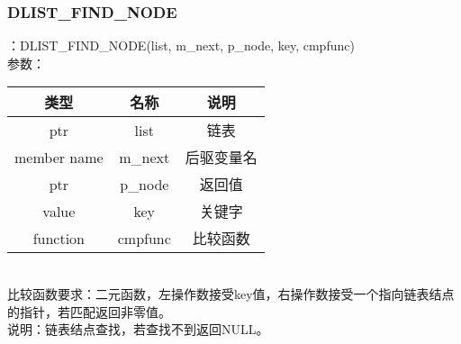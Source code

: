 \subsubsection{DLIST\_FIND\_NODE}
：DLIST\_FIND\_NODE(list, m\_next, p\_node, key, cmpfunc)\\
参数：\\
\begin{tabular}{|c|c|c|}
    \hline
    类型 & 名称 & 说明\\\hline
    ptr & list & 链表\\\hline
    member name & m\_next & 后驱变量名\\\hline
    ptr & p\_node & 返回值\\\hline
    value & key & 关键字\\\hline
    function & cmpfunc & 比较函数\\\hline
\end{tabular}\\
比较函数要求：二元函数，左操作数接受key值，右操作数接受一个指向链表结点的指针，若匹配返回非零值。\\
说明：链表结点查找，若查找不到返回NULL。